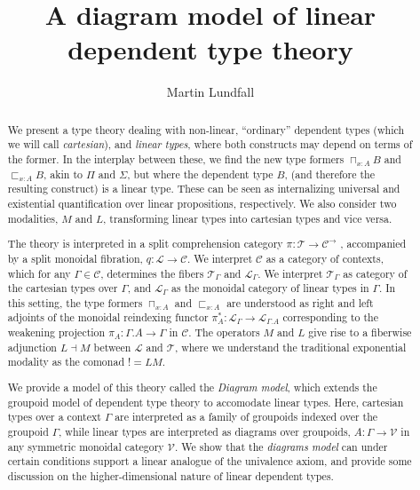 \documentclass[a4paper,english]{lipics-v2018}
\title{A diagram model of linear dependent type theory}
\author{Martin Lundfall}{Stockholm University}{martin@dapp.org}{}{}%
\begin{document}
\maketitle

\begin{abstract}
We present a type theory dealing with non-linear, ``ordinary'' dependent types (which we will call \textit{cartesian}), and \textit{linear types}, where both constructs may depend on terms of the former. In the interplay between these, we find the new type formers $\sqcap_{x : A}B$ and $\sqsubset_{x : A}B$, akin to $\Pi$ and $\Sigma$, but where the dependent type $B$, (and therefore the resulting construct) is a linear type. These can be seen as internalizing universal and existential quantification over linear propositions, respectively. We also consider two modalities, $M$ and $L$, transforming linear types into cartesian types and vice versa.

The theory is interpreted in a split comprehension category $\pi : \mathcal{T} \to \mathcal{C}^\to$ \cite{jacobs}, accompanied by a split monoidal fibration, $q : \mathcal{L} \to \mathcal{C}$. We interpret $\mathcal{C}$ as a category of contexts, which for any $\Gamma \in \mathcal{C}$, determines the fibers $\mathcal{T}_\Gamma$ and $\mathcal{L}_\Gamma$. We interpret $\mathcal{T}_\Gamma$ as category of the cartesian types over $\Gamma$, and $\mathcal{L}_\Gamma$ as the monoidal category of linear types in $\Gamma$. In this setting, the type formers $\sqcap_{x :A}$ and $\sqsubset_{x : A}$ are understood as right and left adjoints of the monoidal reindexing functor $\pi_A^* : \mathcal{L}_\Gamma \to \mathcal{L}_{\Gamma.A}$ corresponding to the weakening projection $\pi_A : \Gamma.A \to \Gamma$ in $\mathcal{C}$. The operators $M$ and $L$ give rise to a fiberwise adjunction $L \dashv M$ between $\mathcal{L}$ and $\mathcal{T}$, where we understand the traditional exponential modality as the comonad $! = LM$.

We provide a model of this theory called the \textit{Diagram model}, which extends the groupoid model of dependent type theory \cite{hofmann1998} to accomodate linear types. Here, cartesian types over a context $\Gamma$ are interpreted as a family of groupoids indexed over the groupoid $\Gamma$, while linear types are interpreted as diagrams over groupoids, $A : \Gamma \to \mathcal{V}$ in any symmetric monoidal category $\mathcal{V}$. We show that the \textit{diagrams model} can under certain conditions support a linear analogue of the univalence axiom, and provide some discussion on the higher-dimensional nature of linear dependent types.
\end{abstract}
\tableofcontents
\end{document}
